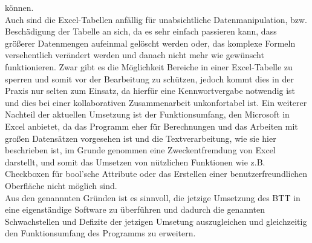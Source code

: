 können.\\Auch sind die Excel-Tabellen anfällig für unabsichtliche Datenmanipulation, bzw. Beschädigung der Tabelle an sich, da es sehr einfach passieren kann, dass größerer Datenmengen aufeinmal gelöscht werden oder, das komplexe Formeln versehentlich verändert werden und danach nicht mehr wie gewünscht funktionieren. Zwar gibt es die Möglichkeit Bereiche in einer Excel-Tabelle zu sperren und somit vor der Bearbeitung zu schützen, jedoch kommt dies in der Praxis nur selten zum Einsatz, da hierfür eine Kennwortvergabe notwendig ist und dies bei einer kollaborativen Zusammenarbeit unkonfortabel ist. Ein weiterer Nachteil der aktuellen Umsetzung ist der Funktionsumfang, den Microsoft in Excel anbietet, da das Programm eher für Berechnungen und das Arbeiten mit großen Datensätzen vorgesehen ist und die Textverarbeitung, wie sie hier beschrieben ist, im Grunde genommen eine Zweckentfremdung von Excel darstellt, und somit das Umsetzen von nützlichen Funktionen wie z.B. Checkboxen für bool'sche Attribute oder das Erstellen einer benutzerfreundlichen Oberfläche nicht möglich sind.\\ Aus den genannnten Gründen ist es sinnvoll, die jetzige Umsetzung des BTT in eine eigenständige Software zu überführen und dadurch die genannten Schwachstellen und Defizite der jetzigen Umsetung auszugleichen und gleichzeitig den Funktionsumfang des Programms zu erweitern.

\begin{comment}
    Voruntersuchung
    •Finden und Definieren des Problems
    •Ist-Analyse
    •Durchführbarkeits-Untersuchung
    -technisch, wirtschaftlich

    Aufgaben
    •Ist-Situation analysieren
    •Hauptanforderungen zusammenstellen
    •Lösungsvarianten betrachten
    •Empfehlung aussprechen
    •Projektkalkulation erstellen
    •Projektplan vorschlagen

    Ergebnisdokumente
    •Lastenheft und Glossar
    •Projektkalkulation und Projektplan

    Lastenheft (themensammlung)
    Erste schriftliche Abstimmung zwischen Auftraggeber und Auftragnehmer über fachliche Basisanforderungen.
    Notwendig, da Aufträge typischerweise unvollständig und widersprüchlich sowie unterschiedlich interpretierbar sind.
    Wird später zum Pflichtenheft erweitert (daher auch: „grobes Pflichtenheft“)
    Im Englischen „Requirements Specification“ (keine Unterscheidung von Lasten-/Pflichtenheft)
\end{comment}





